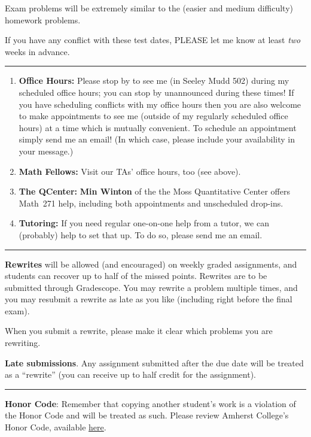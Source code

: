 \documentclass[12pt]{article}
\begin{document}
\noindent Exam problems will be extremely similar to the (easier and medium difficulty) homework problems.
\smallskip

\noindent If you have any conflict with these test dates, PLEASE let me know at least \emph{two} weeks in advance.

\medskip \hrule \medskip

\begin{enumerate}
\item[]{\bf Office Hours:}
 Please stop by to see me (in Seeley Mudd 502) during my scheduled office hours; you can stop by unannounced during these times! If you have scheduling conflicts with my office hours then you are also welcome to make appointments to see me (outside of my regularly scheduled office hours) at a time which is mutually convenient. To schedule an appointment simply send me an email! (In which case, please include your availability in your message.)

\item[] {\bf Math Fellows:} Visit our TAs' office hours, too (see above).
\item[] {\bf The QCenter:} \textbf{Min Winton} of the the Moss Quantitative Center offers Math~271 help, including both appointments and unscheduled drop-ins.
\item[] {\bf Tutoring:} If you need regular one-on-one help from a tutor, we can (probably) help to set that up. To do so, please send me an email.
\end{enumerate}

\medskip \hrule \medskip

\noindent\textbf{Rewrites} will be allowed (and encouraged) on weekly graded assignments, and students can recover up to half of the missed points. Rewrites are to be submitted through Gradescope. You may rewrite a problem multiple times, and you may resubmit a rewrite as late as you like (including right before the final exam).
\medskip

\noindent When you submit a rewrite, please make it clear which problems you are rewriting.

\bigskip
\noindent\textbf{Late submissions}. Any assignment submitted after the due date will be treated as a ``rewrite'' (you can receive up to half credit for the assignment).

\medskip \hrule \medskip

\noindent\textbf{Honor Code}: Remember that copying another student's work is a violation of the Honor Code and will be treated as such. Please review Amherst College's Honor Code, available \href{https://www.amherst.edu/offices/student-affairs/community-standards/college-standards/honor-code}{here}.
\end{document}
